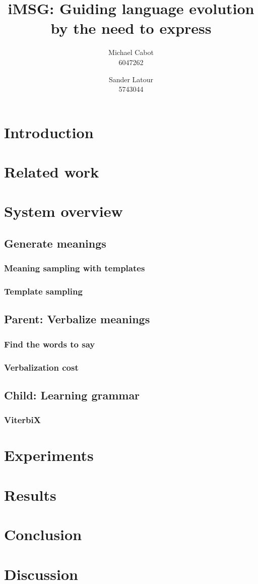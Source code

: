 \documentclass[a4paper]{article}
\title{iMSG: Guiding language evolution by the need to express}
\author{Michael Cabot\\6047262 \and Sander Latour\\5743044}
\begin{document}
\maketitle
\section{Introduction}

\section{Related work}
\section{System overview}
\subsection{Generate meanings}
\subsubsection{Meaning sampling with templates}
\subsubsection{Template sampling}
\subsection{Parent: Verbalize meanings}
\subsubsection{Find the words to say}
\subsubsection{Verbalization cost}
\subsection{Child: Learning grammar}
\subsubsection{ViterbiX}
\section{Experiments}
\section{Results}
\section{Conclusion}
\section{Discussion}
\end{document}
